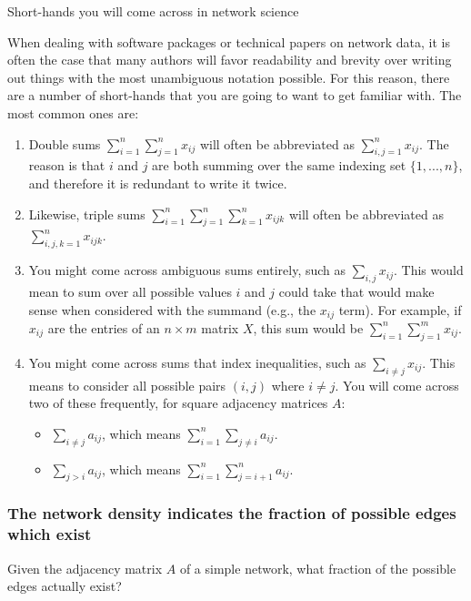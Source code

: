 \begin{floatingbox}[h]\caption{Short-hands you will come across in network science}
\label{box:ch4:sums}
When dealing with software packages or technical papers on network data, it is often the case that many authors will favor readability and brevity over writing out things with the most unambiguous notation possible. For this reason, there are a number of short-hands that you are going to want to get familiar with. The most common ones are:
\begin{enumerate}
    \item Double sums $\sum_{i = 1}^n \sum_{j = 1}^n x_{ij}$ will often be abbreviated as $\sum_{i, j = 1}^nx_{ij}$. The reason is that $i$ and $j$ are both summing over the same indexing set $\{1, ..., n\}$, and therefore it is redundant to write it twice.
    \item Likewise, triple sums $\sum_{i = 1}^n \sum_{j = 1}^n \sum_{k = 1}^n x_{ijk}$ will often be abbreviated as $\sum_{i,j,k = 1}^nx_{ijk}$.
    \item You might come across ambiguous sums entirely, such as $\sum_{i,j}x_{ij}$. This would mean to sum over all possible values $i$ and $j$ could take that would make sense when considered with the summand (e.g., the $x_{ij}$ term). For example, if $x_{ij}$ are the entries of an $n \times m$ matrix $X$, this sum would be $\sum_{i = 1}^n \sum_{j = 1}^m x_{ij}$. 
    \item You might come across sums that index inequalities, such as $\sum_{i \neq j}x_{ij}$. This means to consider all possible pairs $(i, j)$ where $i \neq j$. You will come across two of these frequently, for square adjacency matrices $A$:
    \begin{itemize}
        \item $\sum_{i \neq j} a_{ij}$, which means $\sum_{i = 1}^n \sum_{j \neq i}a_{ij}$.
        \item $\sum_{j > i} a_{ij}$, which means $\sum_{i = 1}^n \sum_{j = i + 1}^n a_{ij}$.
    \end{itemize}
\end{enumerate}
\end{floatingbox}


\subsubsection{The network density indicates the fraction of possible edges which exist}
\label{sec:ch4:prop-net:density}
Given the adjacency matrix $A$ of a simple network, what fraction of the possible edges {actually} exist? 

